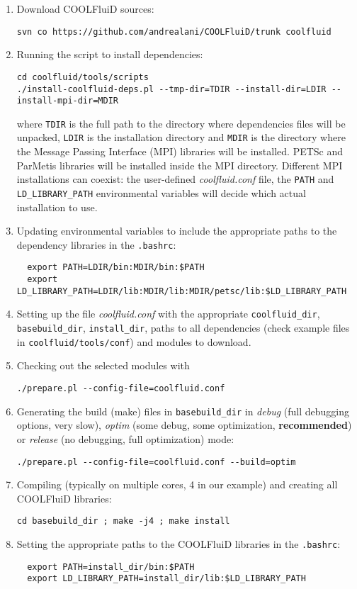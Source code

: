 \documentclass[11pt]{article}
\begin{document}
\begin{enumerate}
\item
  Download COOLFluiD sources: 
\begin{verbatim}
svn co https://github.com/andrealani/COOLFluiD/trunk coolfluid
\end{verbatim}
\item
  Running the script to install dependencies:
\begin{verbatim}
cd coolfluid/tools/scripts
./install-coolfluid-deps.pl --tmp-dir=TDIR --install-dir=LDIR --install-mpi-dir=MDIR
\end{verbatim}
  where \texttt{TDIR} is the full path to the directory where dependencies files will be unpacked,
  \texttt{LDIR} is the installation directory and \texttt{MDIR} is the directory where the 
  Message Passing Interface (MPI) libraries will be installed. PETSc and ParMetis libraries will be installed 
  inside the MPI directory. Different MPI installations can coexist: the user-defined \textit{coolfluid.conf} file,
  the \texttt{PATH} and \texttt{LD\_LIBRARY\_PATH} environmental variables will decide which actual installation to use.
\item
  Updating environmental variables to include the appropriate paths to the dependency libraries 
  in the \texttt{.bashrc}:
\begin{verbatim}
  export PATH=LDIR/bin:MDIR/bin:$PATH
  export LD_LIBRARY_PATH=LDIR/lib:MDIR/lib:MDIR/petsc/lib:$LD_LIBRARY_PATH
\end{verbatim}  
\item
  Setting up the file \textit{coolfluid.conf} with the appropriate \texttt{coolfluid\_dir},
  \texttt{basebuild\_dir}, \texttt{install\_dir}, paths to all dependencies (check example files in 
  \texttt{coolfluid/tools/conf}) and modules to download.
\item
  Checking out the selected modules with
\begin{verbatim}
./prepare.pl --config-file=coolfluid.conf
\end{verbatim}
\item
  Generating the build (make) files in \texttt{basebuild\_dir} in \textit{debug} (full debugging options, very slow), 
  \textit{optim} (some debug, some optimization, \textbf{recommended}) or \textit{release} (no debugging, full optimization) mode:
\begin{verbatim}
./prepare.pl --config-file=coolfluid.conf --build=optim
\end{verbatim}
\item 
  Compiling (typically on multiple cores, 4 in our example) and creating all COOLFluiD libraries:
\begin{verbatim}
cd basebuild_dir ; make -j4 ; make install
\end{verbatim}
\item 
  Setting the appropriate paths to the COOLFluiD libraries in the \texttt{.bashrc}:
\begin{verbatim}
  export PATH=install_dir/bin:$PATH
  export LD_LIBRARY_PATH=install_dir/lib:$LD_LIBRARY_PATH
\end{verbatim}  
\end{enumerate}
\end{document}
